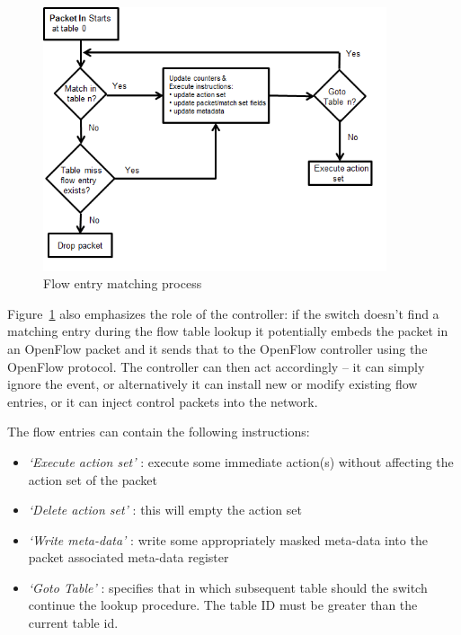 \documentclass[a4paper]{article}
\begin{document}
\begin{figure}[!htb]
    \centering
    \includegraphics[width=0.9\textwidth]{figures/openflow-processing-flowchart.png}
    \caption{Flow entry matching process}
    \label{fig:OpenFlow-matching-process}
\end{figure}

Figure~\ref{fig:OpenFlow-matching-process} also emphasizes the role of the controller: if the switch doesn't find a
matching entry during the flow table lookup it potentially embeds the packet in an OpenFlow packet and it sends that to
the OpenFlow controller using the OpenFlow protocol. The controller can then act accordingly -- it can simply ignore
the event, or alternatively it can install new	or modify existing flow entries, or it can inject control packets into
the network.

The flow entries can contain the following instructions:
\begin{itemize}
    \item \emph{`Execute action set'} : execute some immediate action(s) without affecting the action set of the
          packet
    \item \emph{`Delete action set'} : this will empty the action set
    \item \emph{`Write meta-data'} : write some appropriately masked meta-data into the packet associated meta-data
          register
    \item \emph{`Goto Table'} : specifies that in which subsequent table should the switch continue the lookup
          procedure. The table ID must be greater than the current table id.
\end{itemize}
\end{document}

